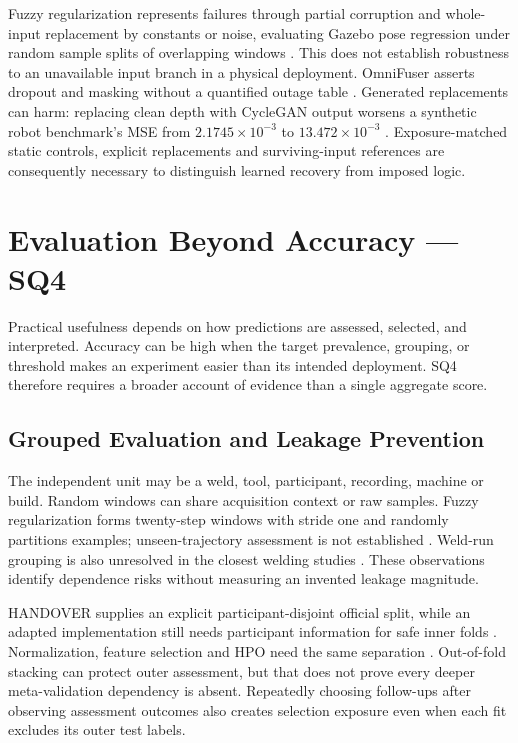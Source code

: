 Fuzzy regularization represents failures through partial corruption and whole-input replacement by constants or noise, evaluating Gazebo pose regression under random sample splits of overlapping windows \citep[PDF pp.~3--5]{Altinses2023Fuzzy}. This does not establish robustness to an unavailable input branch in a physical deployment. OmniFuser asserts dropout and masking without a quantified outage table \citep[PDF p.~10]{P021}. Generated replacements can harm: replacing clean depth with CycleGAN output worsens a synthetic robot benchmark's MSE from $2.1745\times10^{-3}$ to $13.472\times10^{-3}$ \citep[Table~7]{Altinses2025Performance}. Exposure-matched static controls, explicit replacements and surviving-input references are consequently necessary to distinguish learned recovery from imposed logic.

\section{Evaluation Beyond Accuracy --- SQ4}

Practical usefulness depends on how predictions are assessed, selected, and interpreted. Accuracy can be high when the target prevalence, grouping, or threshold makes an experiment easier than its intended deployment. SQ4 therefore requires a broader account of evidence than a single aggregate score.

\subsection{Grouped Evaluation and Leakage Prevention}
The independent unit may be a weld, tool, participant, recording, machine or build. Random windows can share acquisition context or raw samples. Fuzzy regularization forms twenty-step windows with stride one and randomly partitions examples; unseen-trajectory assessment is not established \citep[PDF pp.~4--5]{Altinses2023Fuzzy}. Weld-run grouping is also unresolved in the closest welding studies \citep{P003,Hua2026Weld}. These observations identify dependence risks without measuring an invented leakage magnitude.

HANDOVER supplies an explicit participant-disjoint official split, while an adapted implementation still needs participant information for safe inner folds \citep{Thoduka2024Handover}. Normalization, feature selection and HPO need the same separation \citep{P004,P017}. Out-of-fold stacking can protect outer assessment, but that does not prove every deeper meta-validation dependency is absent. Repeatedly choosing follow-ups after observing assessment outcomes also creates selection exposure even when each fit excludes its outer test labels.

